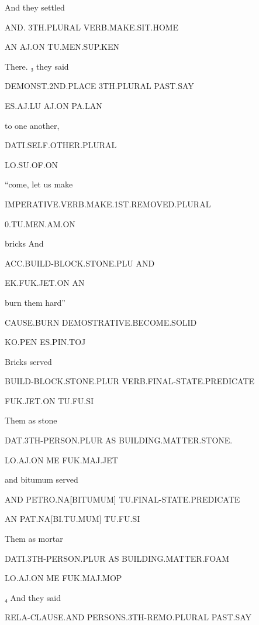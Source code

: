 {  

And 	they 		settled			 

AND.	3TH.PLURAL	VERB.MAKE.SIT.HOME	 

AN	AJ.ON		TU.MEN.SUP.KEN 

  

There.			₃ they		said 	 

DEMONST.2ND.PLACE	3TH.PLURAL	PAST.SAY 

ES.AJ.LU		AJ.ON		PA.LAN	 

  

to one another, 			 

DATI.SELF.OTHER.PLURAL		 

LO.SU.OF.ON 

  

“come, let us make   

IMPERATIVE.VERB.MAKE.1ST.REMOVED.PLURAL 

0.TU.MEN.AM.ON 

 

bricks				And 	 

ACC.BUILD-BLOCK.STONE.PLU 	AND		 

EK.FUK.JET.ON			AN 

  

burn them			hard” 

CAUSE.BURN 			DEMOSTRATIVE.BECOME.SOLID 

KO.PEN				ES.PIN.TOJ				 

Bricks 				served 				 

BUILD-BLOCK.STONE.PLUR          VERB.FINAL-STATE.PREDICATE	 

FUK.JET.ON			TU.FU.SI			 

Them			as 	stone	 

DAT.3TH-PERSON.PLUR AS	BUILDING.MATTER.STONE. 

LO.AJ.ON		ME	FUK.MAJ.JET 

  

and	bitumum 		served  

AND	PETRO.NA[BITUMUM]	TU.FINAL-STATE.PREDICATE 

AN	PAT.NA[BI.TU.MUM]	TU.FU.SI 

  

Them				as 	mortar 

DATI.3TH-PERSON.PLUR               AS	BUILDING.MATTER.FOAM 

LO.AJ.ON			ME	FUK.MAJ.MOP 

  

₄ And 			they 				said  

RELA-CLAUSE.AND          PERSONS.3TH-REMO.PLURAL 	PAST.SAY 

}
